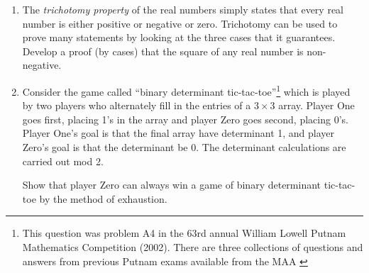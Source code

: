 \begin{enumerate}
{{\tt
var('x y z') \newline
a=[s$\caret$2 for s in [1..10]]  \newline
b=[s$\caret$2 for s in [0..10]]  \newline
s = []  \newline
for x in a:  \newline
\tab for y in b:  \newline
\tab \tab for z in b:  \newline
\tab \tab \tab s = union(s,[x+y+z])  \newline
s = Set(s)  \newline
H=Set([1..100]) \newline
show(H.intersection(s))  \newline
}
}

\wbvfill

\workbookpagebreak

\item The \emph{trichotomy property} of the real 
numbers simply states that every real number is either positive or negative 
or zero.  Trichotomy can be used to prove many statements by looking at the
three cases that it guarantees.  Develop a proof (by cases) that the square of
any real number is non-negative.


\wbvfill

\item Consider the game called ``binary determinant tic-tac-toe''\footnote{ %
This question was problem A4 in the 63rd annual %
William Lowell Putnam Mathematics Competition (2002).  %
There are three collections of questions %
and answers  from previous Putnam exams available from the MAA %
\cite{putnam1,putnam2,putnam3}%
}
which is played by two players who alternately fill in the entries of a 
$3 \times 3$ array.  Player One goes first, placing 1's in the array and 
player Zero goes second, placing 0's.  Player One's goal is that the 
final array have determinant 1, and player Zero's goal is that the 
determinant be 0.  The determinant calculations are carried out mod 2.

Show that player Zero can always win a game of binary determinant tic-tac-toe
by the method of exhaustion.


\wbvfill

\workbookpagebreak

\rule{0pt}{0pt}

\workbookpagebreak

\end{enumerate}
